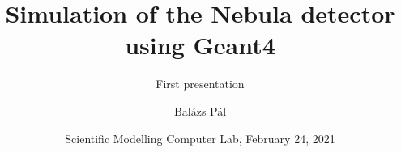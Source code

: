 \title[Geant4]
{Simulation of the Nebula detector using Geant4}

\subtitle{First presentation}

\author[Balázs Pál]
{Balázs Pál}


\date[ELTE 2021]
{Scientific Modelling Computer Lab, February 24, 2021}

